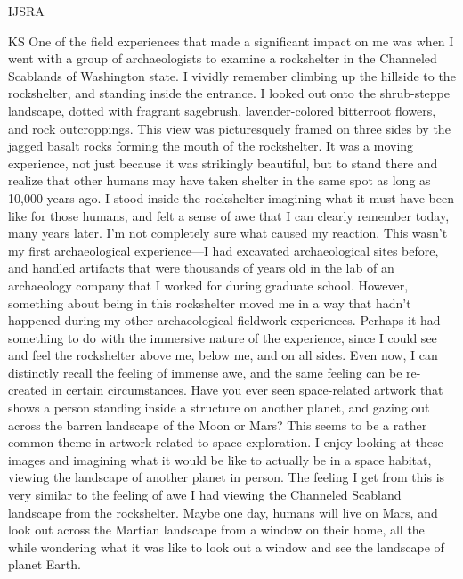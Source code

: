 \begin{labeling}{IJSRA}
	\item[KS] One of the field experiences that made a significant impact on me was when I went with a group of archaeologists to examine a rockshelter in the Channeled Scablands of Washington state. I vividly remember climbing up the hillside to the rockshelter, and standing inside the entrance. I looked out onto the shrub-steppe landscape, dotted with fragrant sagebrush, lavender-colored bitterroot flowers, and rock outcroppings. This view was picturesquely framed on three sides by the jagged basalt rocks forming the mouth of the rockshelter. It was a moving experience, not just because it was strikingly beautiful, but to stand there and realize that other humans may have taken shelter in the same spot as long as 10,000 years ago. I stood inside the rockshelter imagining what it must have been like for those humans, and felt a sense of awe that I can clearly remember today, many years later. I’m not completely sure what caused my reaction. This wasn’t my first archaeological experience—I had excavated archaeological sites before, and handled artifacts that were thousands of years old in the lab of an archaeology company that I worked for during graduate school. However, something about being in this rockshelter moved me in a way that hadn’t happened during my other archaeological fieldwork experiences. Perhaps it had something to do with the immersive nature of the experience, since I could see and feel the rockshelter above me, below me, and on all sides. Even now, I can distinctly recall the feeling of immense awe, and the same feeling can be re-created in certain circumstances. Have you ever seen space-related artwork that shows a person standing inside a structure on another planet, and gazing out across the barren landscape of the Moon or Mars? This seems to be a rather common theme in artwork related to space exploration. I enjoy looking at these images and imagining what it would be like to actually be in a space habitat, viewing the landscape of another planet in person. The feeling I get from this is very similar to the feeling of awe I had viewing the Channeled Scabland landscape from the rockshelter. Maybe one day, humans will live on Mars, and look out across the Martian landscape from a window on their home, all the while wondering what it was like to look out a window and see the landscape of planet Earth.

\end{labeling}

\IJSRAseparator


